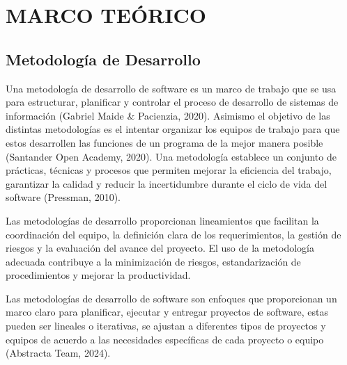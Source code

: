 \chapter{MARCO TEÓRICO}
\label{cap:marco}

\section{Metodología de Desarrollo}
\label{sec:metodologia-desarrollo}

Una metodología de desarrollo de software es un marco de trabajo que se usa
para estructurar, planificar y controlar el proceso de desarrollo de sistemas de
información (Gabriel Maide \& Pacienzia, 2020). Asimismo el objetivo de las
distintas metodologías es el intentar organizar los equipos de trabajo para que
estos desarrollen las funciones de un programa de la mejor manera posible
(Santander Open Academy, 2020). Una metodología establece un conjunto de prácticas, técnicas
y procesos que permiten mejorar la eficiencia del trabajo, garantizar la
calidad y reducir la incertidumbre durante el ciclo de vida del software
(Pressman, 2010).

Las metodologías de desarrollo proporcionan lineamientos que facilitan la
coordinación del equipo, la definición clara de los requerimientos, la gestión
de riesgos y la evaluación del avance del proyecto. El uso de la metodología
adecuada contribuye a la minimización de riesgos, estandarización de
procedimientos y mejorar la productividad.

Las metodologías de desarrollo de software son enfoques que proporcionan un
marco claro para planificar, ejecutar y entregar proyectos de software, estas
pueden ser lineales o iterativas, se ajustan a diferentes tipos de proyectos y
equipos de acuerdo a las necesidades específicas de cada proyecto o equipo
(Abstracta Team, 2024).

